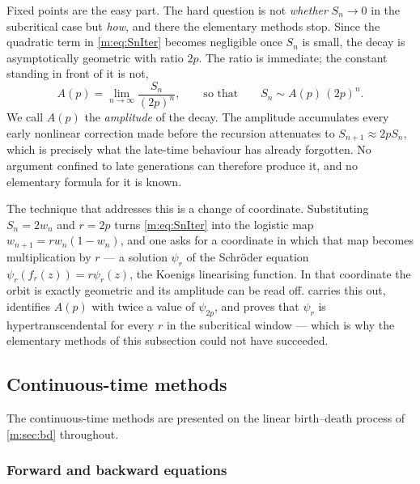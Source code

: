Fixed points are the easy part. The hard question is not \emph{whether} $S_n\to0$
in the subcritical case but \emph{how}, and there the elementary methods stop.
Since the quadratic term in \cref{m:eq:SnIter} becomes negligible once $S_n$ is
small, the decay is asymptotically geometric with ratio $2p$. The ratio is
immediate; the constant standing in front of it is not,
\begin{equation}
\label{m:eq:Apdef}
A(p) = \lim_{n\to\infty}\frac{S_n}{(2p)^n},
\qquad\text{so that}\qquad
S_n\sim A(p)\,(2p)^n .
\end{equation}
We call $A(p)$ the \emph{amplitude} of the decay. The amplitude accumulates every
early nonlinear correction made before
the recursion attenuates to $S_{n+1}\approx2pS_n$, which is precisely what the
late-time behaviour has already forgotten. No argument confined to late generations
can therefore produce it, and no elementary formula for it is known.

The technique that addresses this is a change of coordinate. Substituting
$S_n=2w_n$ and $r=2p$ turns \cref{m:eq:SnIter} into the logistic map
$w_{n+1}=rw_n(1-w_n)$, and one asks for a coordinate in which that map becomes
multiplication by $r$ --- a solution $\psi_r$ of the Schröder equation
$\psi_r(f_r(z))=r\psi_r(z)$, the Koenigs linearising function. In that coordinate
the orbit is exactly geometric and its amplitude can be read off. \ChAcap{} carries
this out, identifies $A(p)$ with twice a value of $\psi_{2p}$, and proves that
$\psi_r$ is hypertranscendental for every $r$ in the subcritical window --- which
is why the elementary methods of this subsection could not have succeeded.

\subsection{Continuous-time methods}
\label{m:sec:ctmethods}

The continuous-time methods are presented on the linear birth--death process of
\cref{m:sec:bd} throughout.

\subsubsection{Forward and backward equations}
\label{m:sec:backward}

